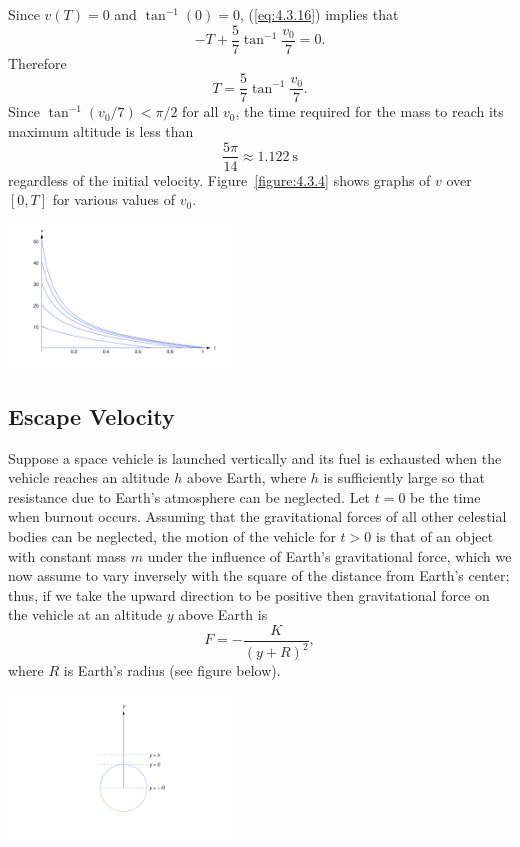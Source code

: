 \documentclass{ximera}
\begin{document}
\begin{example}
\begin{explanation}
 Since $v(T)=0$ and $\tan^{-1}(0)=0$, (\ref{eq:4.3.16}) implies that
$$
-T+\frac{5}{7} \tan^{-1}\frac{v_0}{7}=0.
$$
Therefore
$$
T=\frac{5}{7} \tan^{-1}\frac{v_0}{7}.
$$
Since $\tan^{-1}(v_0/7)<\pi/2$ for all $v_0$,
the  time required for the mass to reach its maximum
altitude is less than
$$
\frac{5\pi}{14} \approx 1.122\  \mbox{s}
$$
regardless of the initial velocity.  Figure~\ref{figure:4.3.4}
shows graphs of $v$ over $[0,T]$ for various values of $v_0$.

\begin{image}
  \includegraphics[height=1.5in]{fig040304.jpg} 
\end{image}
\end{explanation}
\end{example}

\subsection*{Escape Velocity}

Suppose a space vehicle is launched vertically and its fuel is
exhausted when the vehicle reaches an altitude $h$ above Earth, where
$h$ is sufficiently large so that resistance due to Earth's atmosphere
can be neglected. Let $t=0$ be the time when burnout occurs.
Assuming that the gravitational forces of all other celestial bodies
can be neglected, the motion of the vehicle for $t > 0$ is that of an
object with constant mass $m$ under the influence of Earth's
gravitational force, which we now assume to vary inversely with the
square of the distance from Earth's center;  thus, if we take the
upward direction to be positive then
gravitational force on the vehicle at an altitude $y$ above Earth is
\begin{equation} \label{eq:4.3.18}
F=-\frac{K}{(y+R)^2},
\end{equation}
where $R$ is  Earth's radius (see figure below).

\begin{image}
  \includegraphics[height=1.5in]{fig040305.jpg} 
\end{image}
\end{document}
